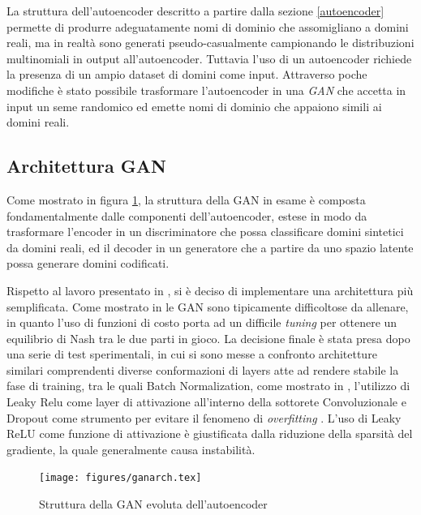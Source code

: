 La struttura dell'autoencoder descritto a partire dalla sezione \ref{autoencoder} permette di produrre adeguatamente nomi di dominio che assomigliano a domini reali, ma in realtà sono generati pseudo-casualmente campionando le distribuzioni multinomiali in output all'autoencoder. Tuttavia l'uso di un autoencoder richiede la presenza di un ampio dataset di domini come input. Attraverso poche modifiche è stato possibile trasformare l'autoencoder in una \textit{GAN} che accetta in input un seme randomico ed emette nomi di dominio che appaiono simili ai domini reali.

\subsection{Architettura GAN}
\label{ganarch}
Come mostrato in figura \ref{fig:archgan}, la struttura della GAN in esame è composta fondamentalmente dalle componenti dell'autoencoder, estese in modo da trasformare l'encoder in un discriminatore che possa classificare domini sintetici da domini reali, ed il decoder in un generatore che a partire da uno spazio latente possa generare domini codificati.

Rispetto al lavoro presentato in \cite{deepdga}, si è deciso di implementare una architettura più semplificata. Come mostrato in \cite{1606.03498} le GAN sono tipicamente difficoltose da allenare, in quanto l'uso di funzioni di costo porta ad un difficile \textit{tuning} per ottenere un equilibrio di Nash tra le due parti in gioco. La decisione finale è stata presa dopo una serie di test sperimentali, in cui si sono messe a confronto architetture similari comprendenti diverse conformazioni di layers atte ad rendere stabile la fase di training, tra le quali Batch Normalization, come mostrato in \cite{1502.03167},  l'utilizzo di Leaky Relu \cite{GANhacks} come layer di attivazione all'interno della sottorete Convoluzionale e Dropout come strumento per evitare il fenomeno di \textit{overfitting} \cite{dropout}. L'uso di Leaky ReLU come funzione di attivazione è giustificata dalla riduzione della sparsità  del gradiente, la quale generalmente causa instabilità.

\begin{figure}[!htb]
    \centering
	\texttt{[image: figures/ganarch.tex]}
	\caption{Struttura della GAN evoluta dell'autoencoder}
\label{fig:archgan}
\end{figure}


